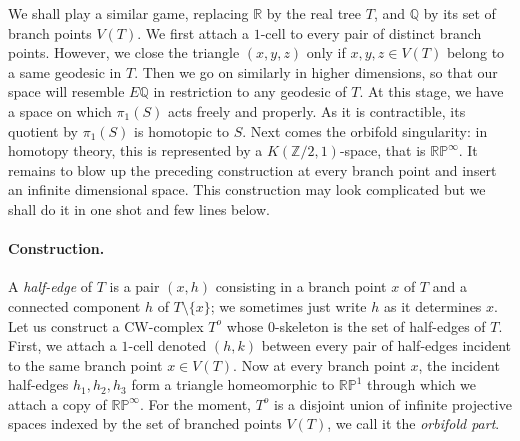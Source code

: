 \documentclass[10pt,a4paper]{amsart}
\renewcommand{\P}{\mathbb{P}}
\newcommand{\R}{\mathbb{R}}
\newcommand{\Z}{\mathbb{Z}}
\newcommand{\Q}{\mathbb{Q}}
\begin{document}
We shall play a similar game, replacing $\R$ by the real tree $T$, and $\Q$ by its set of branch points $V(T)$. We first attach a $1$-cell to every pair of distinct branch points. However, we close the triangle $(x,y,z)$ only if $x,y,z \in V(T)$ belong to a same geodesic in $T$. Then we go on similarly in higher dimensions, so that our space will resemble $E\Q$ in restriction to any geodesic of $T$. At this stage, we have a space on which $\pi_1(S)$ acts freely and properly. As it is contractible, its quotient by $\pi_1(S)$ is homotopic to $S$.
%
Next comes the orbifold singularity: in homotopy theory, this is represented by a $K(\Z/2,1)$-space, that is $\R\P^\infty$. It remains to blow up the preceding construction at every branch point and insert an infinite dimensional space. This construction may look complicated but we shall do it in one shot and few lines below.

\paragraph{Construction.}
A \emph{half-edge} of $T$ is a pair $(x,h)$ consisting in a branch point $x$ of $T$ and a connected component $h$ of $T\setminus\{x\}$; we sometimes just write $h$ as it determines $x$. Let us construct a CW-complex $T^o$ whose $0$-skeleton is the set of half-edges of $T$.
%
First, we attach a $1$-cell denoted $(h,k)$ between every pair of half-edges incident to the same branch point $x\in V(T)$. 
%
Now at every branch point $x$, the incident half-edges $h_1,h_2,h_3$ form a triangle homeomorphic to $\R\P^1$ through which we attach a copy of $\R\P^\infty$.
%
For the moment, $T^o$ is a disjoint union of infinite projective spaces indexed by the set of branched points $V(T)$, we call it the \emph{orbifold part}.
\end{document}
